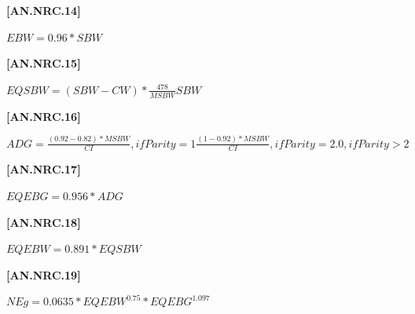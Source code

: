 \documentclass{article}
\begin{document}
\begin{refsection}
\begin{itemize}
\vspace{0.5cm}
            {\raggedleft \textbf{[AN.NRC.14]}\par}
\vspace{0.25cm}

\begin{center}
    \(EBW = 0.96 * SBW\)
\end{center}
\vspace{0.5cm}

            {\raggedleft \textbf{[AN.NRC.15]}\par}
\vspace{0.25cm}

\begin{center}
    \(EQSBW = (SBW - CW) *\frac{478}{MSBW} SBW\)
\end{center}
\vspace{0.5cm}

            {\raggedleft \textbf{[AN.NRC.16]}\par}
\vspace{0.25cm}

\begin{center}
    \(ADG = \frac{(0.92 - 0.82) * MSBW}{CI}, if Parity = 1 \frac{(1 - 0.92) * MSBW}{CI}, if Parity = 2.0, if Parity > 2\)
\end{center}
\vspace{0.5cm}

            {\raggedleft \textbf{[AN.NRC.17]}\par}
\vspace{0.25cm}

\begin{center}
    \(EQEBG = 0.956 * ADG\)
\end{center}
\vspace{0.5cm}

            {\raggedleft \textbf{[AN.NRC.18]}\par}
    \vspace{0.25cm}
    
\begin{center}
    \(EQEBW = 0.891 * EQSBW\)
\end{center}

\vspace{0.5cm}
            {\raggedleft \textbf{[AN.NRC.19]}\par}
\vspace{0.25cm}

\begin{center}
    \(NEg = 0.0635 * EQEBW^{0.75} * EQEBG^{1.097}\)
\end{center}


\end{itemize}
\end{refsection}
\end{document}
